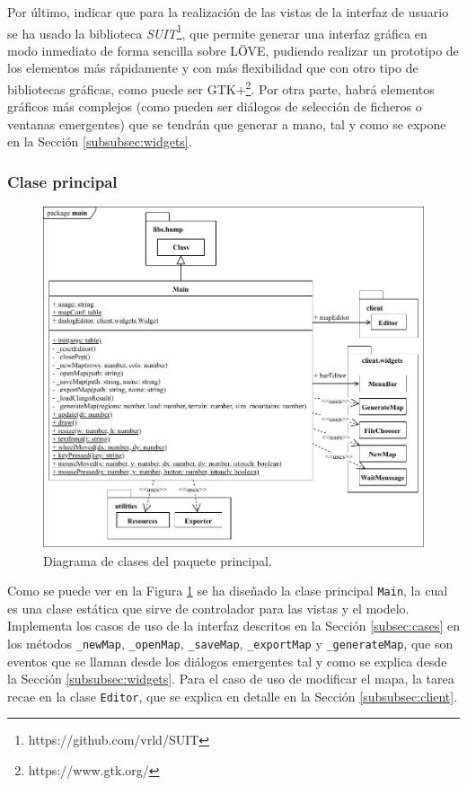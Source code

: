 Por último, indicar que para la realización de las vistas de la interfaz de usuario se ha usado la biblioteca \textit{SUIT}\footnote{https://github.com/vrld/SUIT}, que permite generar una interfaz gráfica en modo inmediato de forma sencilla sobre LÖVE, pudiendo realizar un prototipo de los elementos más rápidamente y con más flexibilidad que con otro tipo de bibliotecas gráficas, como puede ser GTK+\footnote{https://www.gtk.org/}. Por otra parte, habrá elementos gráficos más complejos (como pueden ser diálogos de selección de ficheros o ventanas emergentes) que se tendrán que generar a mano, tal y como se expone en la Sección \ref{subsubsec:widgets}.

\subsubsection{Clase principal}
\label{subsubsec:main}

\begin{figure}[!h]
	\centering
	\includegraphics[width=\textwidth]{images/clase-principal.pdf}
	\caption{Diagrama de clases del paquete principal.}
	\label{fig:mainclass}
\end{figure}

Como se puede ver en la Figura \ref{fig:mainclass} se ha diseñado la clase principal \texttt{Main}, la cual es una clase estática que sirve de controlador para las vistas y el modelo. Implementa los casos de uso de la interfaz descritos en la Sección \ref{subsec:cases} en los métodos \texttt{\_newMap}, \texttt{\_openMap}, \texttt{\_saveMap}, \texttt{\_exportMap} y \texttt{\_generateMap}, que son eventos que se llaman desde los diálogos emergentes tal y como se explica desde la Sección \ref{subsubsec:widgets}. Para el caso de uso de modificar el mapa, la tarea recae en la clase \texttt{Editor}, que se explica en detalle en la Sección \ref{subsubsec:client}. \\

